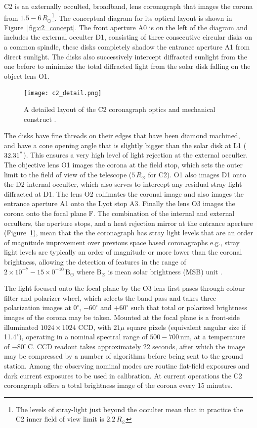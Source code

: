 C2 is an externally occulted, broadband, lens coronagraph that images the corona from $1.5-6\,R_{\odot}$\footnote{The levels of stray-light just beyond the occulter mean that in practice the C2 inner field of view limit is $2.2\,R_{\odot}$}. The conceptual diagram for its optical layout is shown in Figure~\ref{fig:c2_concept}. The front aperture A0 is on the left of the diagram and includes the external occulter D1, consisting of three consecutive circular disks on a common spindle, these disks completely shadow the entrance aperture A1 from direct sunlight. The disks also successively intercept diffracted sunlight from the one before to minimize the total diffracted light from the solar disk falling on the object lens O1. 
\begin{figure}[!t]
\begin{center}
\texttt{[image: c2\_detail.png]}
\caption[The LASCO C2 coronagraph detail]{A detailed layout of the C2 coronagraph optics and mechanical construct \citep{bru95}.}
\label{fig:c2_detail}
\end{center}
\end{figure}
The disks have fine threads on their edges that have been diamond machined, and have a cone opening angle that is slightly bigger than the solar disk at L1 ($32.31^"$). This ensures a very high level of light rejection at the external occulter. The objective lens O1 images the corona at the field stop, which sets the outer limit to the field of view of the telescope ($5\,R_{\odot}$ for C2). O1 also images D1 onto the D2 internal occulter, which also serves to intercept any residual stray light diffracted at D1. The lens O2 collimates the coronal image and also images the entrance aperture A1 onto the Lyot stop A3. Finally the lens O3 images the corona onto the focal plane F. The combination of the internal and external occulters, the aperture stops, and a heat rejection mirror at the entrance aperture (Figure~\ref{fig:c2_detail}), mean that the the coronagraph has stray light levels that are an order of magnitude improvement over previous space based coronagraphs e.g., stray light levels are typically an order of magnitude or more lower than the coronal brightness, allowing the detection of features in the range of $2\times10^{-7} - 15\times0^{-10}\,\mathrm{B}_{\odot}$ where $\mathrm{B}_{\odot}$ is mean solar brightness (MSB) unit \citep{bru95}.

The light focused onto the focal plane by the O3 lens first pases through colour filter and polarizer wheel, which selects the band pass and takes three polarization images at $0^{\circ}$, $-60^{\circ}$ and $+60^{\circ}$ such that total or polarized brightness images of the corona may be taken. Mounted at the focal plane is a front-side illuminated $1024\times1024$ CCD, with $21\mu$ square pixels (equivalent angular size if 11.4"),  operating in a nominal spectral range of $500-700$\,nm, at a temperature of $-80^{\circ}$\,C. CCD readout takes approximately 22 seconds, after which the image may be compressed by a number of algorithms before being sent to the ground station. Among the observing nominal modes are routine flat-field exposures and dark current exposures to be used in calibration. At current operations the C2 coronagraph offers a total brightness image of the corona every 15 minutes.  

